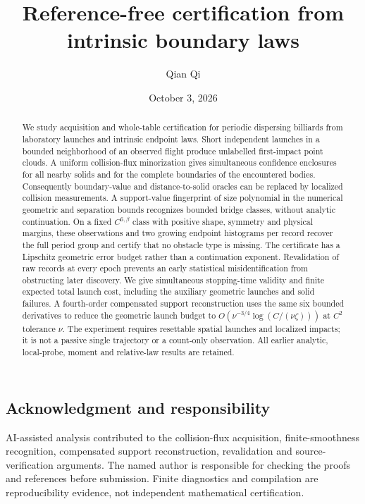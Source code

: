 \documentclass[11pt]{amsart}
\title[Reference-free certification]{Reference-free certification from intrinsic boundary laws}
\author{Qian Qi}\date{October 3, 2026}
\theoremstyle{definition}\newtheorem{definition}[theorem]{Definition}
\theoremstyle{remark}\newtheorem{remark}[theorem]{Remark}
\numberwithin{equation}{section}
\begin{document}
\raggedbottom
\begin{abstract}
We study acquisition and whole-table certification for periodic dispersing
billiards from laboratory launches and intrinsic endpoint laws. Short
independent launches in a bounded neighborhood of an observed flight
produce unlabelled first-impact point clouds. A uniform collision-flux
minorization gives simultaneous confidence enclosures for all nearby
solids and for the complete boundaries of the encountered bodies.
Consequently boundary-value and distance-to-solid oracles can be replaced
by localized collision measurements. A support-value fingerprint of size
polynomial in the numerical geometric and separation bounds recognizes
bounded bridge classes, without analytic continuation. On a fixed
$C^{6,\beta}$ class with positive shape, symmetry and physical margins,
these observations and two growing endpoint histograms per record recover
the full period group and certify that no obstacle type is missing.
The certificate has a Lipschitz geometric error budget rather than a
continuation exponent. Revalidation of raw records at every epoch prevents
an early statistical misidentification from obstructing later discovery.
We give simultaneous stopping-time validity and finite expected total
launch cost, including the auxiliary geometric launches and solid failures.
A fourth-order compensated support reconstruction uses the same six
bounded derivatives to reduce the geometric launch budget to
$O(\nu^{-3/4}\log(C/(\nu\zeta)))$ at $C^2$ tolerance $\nu$.
The experiment requires resettable spatial launches and localized impacts;
it is not a passive single trajectory or a count-only observation.
All earlier analytic, local-probe, moment and relative-law results are retained.
\end{abstract}
\maketitle
\enlargethispage{2pt}







\subsection*{Acknowledgment and responsibility}
AI-assisted analysis contributed to the collision-flux acquisition,
finite-smoothness recognition, compensated support reconstruction, revalidation and source-verification
arguments. The named author is responsible for checking the proofs and
references before submission. Finite diagnostics and compilation are
reproducibility evidence, not independent mathematical certification.

\end{document}
